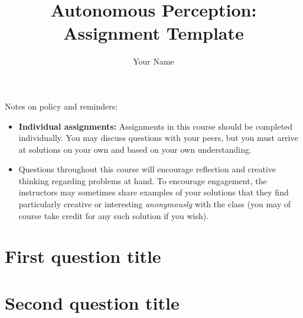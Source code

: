 \documentclass[letterpaper, 12pt]{article}
\title{%
  Autonomous Perception: Assignment Template
}
\author{%
  Your Name
}
\begin{document}
\maketitle

\noindent
Notes on policy and reminders:
\begin{itemize}
  \item \textbf{Individual assignments:} Assignments in this course should be
    completed individually.
    You may discuss questions with your peers, but you must arrive at solutions
    on your own and based on your own understanding.
  \item Questions throughout this course will encourage reflection and creative
    thinking regarding problems at hand.
    To encourage engagement, the instructors may sometimes share examples of
    your solutions that they find particularly creative or interesting
    \emph{anonymously} with the class
    (you may of course take credit for any such solution if you wish).
\end{itemize}

\section{First question title}

\section{Second question title}
\end{document}
